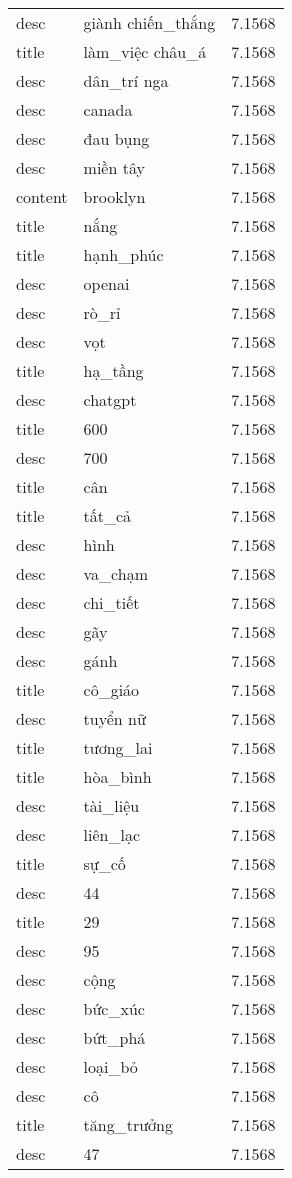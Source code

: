 \documentclass{article}
\begin{document}
\begin{tabular}{lll}
desc & giành chiến\_thắng & 7.1568\\
title & làm\_việc châu\_á & 7.1568\\
desc & dân\_trí nga & 7.1568\\
desc & canada & 7.1568\\
desc & đau bụng & 7.1568\\
desc & miền tây & 7.1568\\
content & brooklyn & 7.1568\\
title & nắng & 7.1568\\
title & hạnh\_phúc & 7.1568\\
desc & openai & 7.1568\\
desc & rò\_rỉ & 7.1568\\
desc & vọt & 7.1568\\
title & hạ\_tầng & 7.1568\\
desc & chatgpt & 7.1568\\
title & 600 & 7.1568\\
desc & 700 & 7.1568\\
title & cân & 7.1568\\
title & tất\_cả & 7.1568\\
desc & hình & 7.1568\\
desc & va\_chạm & 7.1568\\
desc & chi\_tiết & 7.1568\\
desc & gãy & 7.1568\\
desc & gánh & 7.1568\\
title & cô\_giáo & 7.1568\\
desc & tuyển nữ & 7.1568\\
title & tương\_lai & 7.1568\\
title & hòa\_bình & 7.1568\\
desc & tài\_liệu & 7.1568\\
desc & liên\_lạc & 7.1568\\
title & sự\_cố & 7.1568\\
desc & 44 & 7.1568\\
title & 29 & 7.1568\\
desc & 95 & 7.1568\\
desc & cộng & 7.1568\\
desc & bức\_xúc & 7.1568\\
desc & bứt\_phá & 7.1568\\
desc & loại\_bỏ & 7.1568\\
desc & cô & 7.1568\\
title & tăng\_trưởng & 7.1568\\
desc & 47 & 7.1568\\

\end{tabular}
\end{document}
